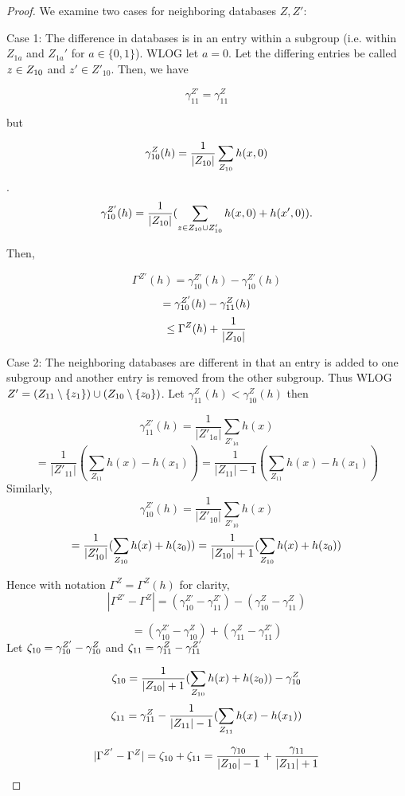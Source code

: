 \begin{proof}
We examine two cases for neighboring databases $Z, Z'$:

Case 1: The difference in databases is in an entry within a subgroup
(i.e. within $Z_{1a}$ and $Z_{1a}'$ for $a \in \{0, 1\}$). WLOG let $a
= 0$. Let the differing entries be called $z \in Z_{10}$ and $z' \in
Z'_{10}$. Then, we have

$$\gamma^{Z'}_{11} = \gamma^Z_{11}$$

but

$$\gamma_{10}^Z(h) = \frac{1}{|Z_{10}|} \sum_{Z_{10}} h(x,0)$$.
$$\gamma_{10}^{Z'}(h) = \frac{1}{|Z_{10}|} (\sum_{z \in Z_{10} \cup Z_{10}'} h(x, 0) + h(x', 0)).$$

Then,

$$ \Gamma^{Z'}(h) = \gamma_{10}^{Z'}(h) - \gamma_{10}^{Z'}(h) $$
$$ = \gamma_{10}^{Z'}(h) - \gamma_{11}^Z(h) $$
$$ \leq \Gamma^{Z}(h) + \frac{1}{|Z_{10}|} $$


Case 2: The neighboring databases are different in that an entry is added to one subgroup and another entry is removed from the other subgroup. Thus WLOG $Z' =(Z_{11}\setminus
\{z_1\} )\cup( Z_{10}\setminus \{z_0\})$. Let $\gamma_{11}^{Z}(h)
<\gamma_{10}^{Z}(h)$ then

$$\gamma_{11}^{Z'}(h) = \frac{1}{|Z'_{1a}|} \sum_{Z'_{1a}} h(x)$$
$$= \frac{1}{|Z'_{11}|} (\sum_{Z_{11}} h(x)-h(x_1)) = \frac{1}{|Z_{11}|-1} (\sum_{Z_{11}} h(x)-h(x_1))$$
Similarly,
$$\gamma_{10}^{Z'}(h) = \frac{1}{|Z'_{10}|} \sum_{Z'_{10}} h(x)$$
$$ = \frac{1}{|Z'_{10}|} (\sum_{Z_{10}} h(x)+h(z_0))= \frac{1}{|Z_{10}|+1} (\sum_{Z_{10}} h(x)+h(z_0))$$

Hence with notation $ \Gamma^Z = \Gamma^Z(h)$ for clarity, $$|\Gamma^{Z'}- \Gamma^{Z}| = (\gamma_{10}^{Z'} - \gamma_{11}^{Z'}) - (\gamma_{10}^{Z} - \gamma_{11}^{Z})$$


$$=(\gamma_{10}^{Z'}- \gamma_{10}^{Z}) + (\gamma_{11}^{Z} -\gamma_{11}^{Z'})$$
Let $\zeta_{10}= \gamma_{10}^{Z'}- \gamma_{10}^{Z}$ and  $\zeta_{11} = \gamma_{11}^{Z} -\gamma_{11}^{Z'}$

$$\zeta_{10} = \frac{1}{|Z_{10}|+1} (\sum_{Z_{10}} h(x)+h(z_0)) - \gamma_{10}^{Z}$$
$$\zeta_{11} = \gamma_{11}^{Z}- \frac{1}{|Z_{11}|-1} (\sum_{Z_{11}} h(x)-h(x_1))$$

$$|\Gamma^{Z'}- \Gamma^{Z}| = \zeta_{10} + \zeta_{11}= \frac{\gamma_{10}}{|Z_{10}|-1} + \frac{\gamma_{11}}{|Z_{11}|+1} $$
\end{proof}

